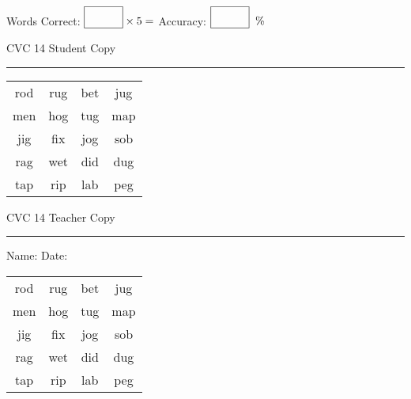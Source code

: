 \documentclass{memoir}
\begin{document}
\small

Words Correct: $\fbox{\phantom{\huge 100}} \times 5 = $ Accuracy: $\fbox{\phantom{\huge 100}}\;\; \%$ 

\vfill

\newpage


\footnotesize \noindent
CVC 14 \hfill Student Copy
\smallskip
\hrule

\Large

\setlength{\tabcolsep}{14pt}
\def\arraystretch{2}

{\selectfont


\begin{vplace}[0.5]
\begin{center}
\begin{tabular}{cccc}
rod & rug & bet & jug \\
men & hog & tug & map \\
jig & fix & jog & sob \\
rag & wet & did & dug \\
tap & rip & lab & peg \\
\end{tabular}
\end{center}
\end{vplace}

}

\newpage

\footnotesize \noindent
CVC 14 \hfill Teacher Copy
\smallskip
\hrule

\small

\vfill

\noindent
Name: \underline{\hspace{1.75in}} \hfill Date: \underline{\hspace{1in}}

\Large

{\selectfont


\begin{vplace}[0.5]
\begin{center}
\begin{tabular}{cccc}
rod & rug & bet & jug \\
men & hog & tug & map \\
jig & fix & jog & sob \\
rag & wet & did & dug \\
tap & rip & lab & peg \\
\end{tabular}
\end{center}
\end{vplace}



}
\end{document}
